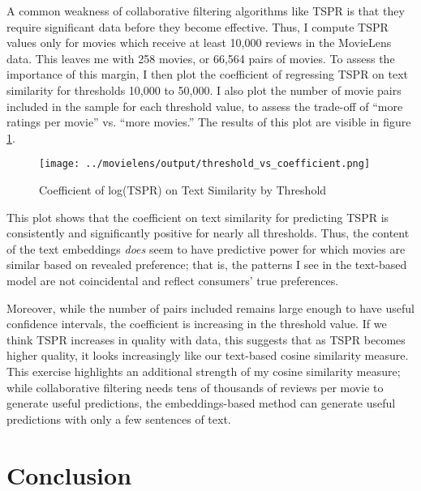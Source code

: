 \documentclass{article}
\begin{document}
A common weakness of collaborative filtering algorithms like TSPR is that they require significant data before they become effective. Thus, I compute TSPR values only for movies which receive at least 10,000 reviews in the MovieLens data. This leaves me with 258 movies, or 66,564 pairs of movies. To assess the importance of this margin, I then plot the coefficient of regressing TSPR on text similarity for thresholds 10,000 to 50,000. I also plot the number of movie pairs included in the sample for each threshold value, to assess the trade-off of ``more ratings per movie'' vs. ``more movies.'' The results of this plot are visible in figure \ref{fig:tspr_threshold}. 

\begin{figure}
    \begin{center}
    \texttt{[image: ../movielens/output/threshold\_vs\_coefficient.png]}
    \caption{Coefficient of log(TSPR) on Text Similarity by Threshold}
    \label{fig:tspr_threshold}
    \end{center}
\end{figure}

This plot shows that the coefficient on text similarity for predicting TSPR is consistently and significantly positive for nearly all thresholds. Thus, the content of the text embeddings \emph{does} seem to have predictive power for which movies are similar based on revealed preference; that is, the patterns I see in the text-based model are not coincidental and reflect consumers' true preferences. 

Moreover, while the number of pairs included remains large enough to have useful confidence intervals, the coefficient is increasing in the threshold value. If we think TSPR increases in quality with data, this suggests that as TSPR becomes higher quality, it looks increasingly like our text-based cosine similarity measure. This exercise highlights an additional strength of my cosine similarity measure; while collaborative filtering needs tens of thousands of reviews per movie to generate useful predictions, the embeddings-based method can generate useful predictions with only a few sentences of text.







\section{Conclusion}
\end{document}
